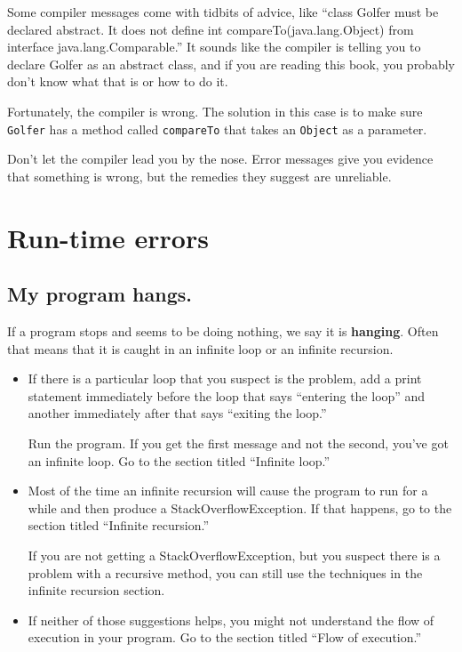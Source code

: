 \documentclass[12pt]{book}
\theoremstyle{exercise}
\begin{document}
Some compiler messages come with tidbits of advice, like
``class Golfer must be declared
abstract. It does not define int compareTo(java.lang.Object) from
interface java.lang.Comparable.''  It sounds like the compiler
is telling you to declare Golfer as an abstract class, and if
you are reading this book, you probably don't know what that is
or how to do it.

Fortunately, the compiler is wrong.  The solution in this case
is to make sure {\tt Golfer} has a method called {\tt compareTo}
that takes an {\tt Object} as a parameter.

Don't let the compiler lead you by the nose.  Error
messages give you evidence that something is wrong, but
the remedies they suggest are unreliable.


\section{Run-time errors}

\subsection*{My program hangs.}

If a program stops and seems to be doing nothing, we
say it is {\bf hanging}.  Often that means that it is caught in
an infinite loop or an infinite recursion.

\begin{itemize}

\item If there is a particular loop that you suspect is the
problem, add a print statement immediately before the loop
that says
``entering the loop'' and another immediately after that
says ``exiting the loop.''

Run the program.  If you get the first message and not
the second, you've got an infinite loop.  Go to the section
titled ``Infinite loop.''

\item Most of the time an infinite recursion will cause the program
to run for a while and then produce a StackOverflowException.
If that happens, go to the section titled ``Infinite recursion.''

If you are not getting a StackOverflowException, but you suspect
there is a problem with a recursive method, you can still use
the techniques in the infinite recursion section.

\item If neither of those suggestions helps, you might not
understand the flow of execution in your program.
Go to the section titled ``Flow of execution.''

\end{itemize}
\end{document}
